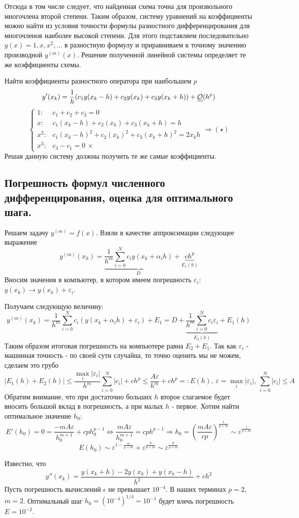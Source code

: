 Отсюда в том числе следует, что найденная схема точна для произвольного
многочлена второй степени. Таким образом, систему уравнений на
коэффициенты можно найти из условия точности формулы разностного
дифференцирования для многочленов наиболее высокой степени. Для этого
подставляем последовательно $y(x)=1,x,x^2,\ldots$ в разностную формулу
и приравниваем к точному значению производной $y^{(m)}(x)$.
Решение полученной линейной системы определяет те же коэффициенты схемы.
\begin{example}
  Найти коэффициенты разностного оператора при наибольшем $p$
  \[y'(x_k)=\frac{1}{h}(c_1y(x_k-h)+c_2y(x_k)+c_3y(x_k+h))+\underline{\underline{\mathcal{O}}}(h^p)\]
  \[\begin{cases}
      1:   & c_1+c_2+c_3=0                                \\
      x:   & c_1(x_k-h)+c_2(x_k)+c_3(x_k+h)=h             \\
      x^2: & c_1(x_k-h)^2+c_2(x_k)^2 + c_3(x_k+h)^2=2x_kh \\
      x^3: & c_3-c_1=0\ \times
    \end{cases}\Rightarrow (\star)\]
  Решая данную систему должны получить те же самые коэффициенты.
\end{example}

\subsection*{Погрешность формул
  численного дифференцирования, оценка для оптимального шага.}

Решаем задачу $y^{(m)}=f(x)$.
Взяли в качестве аппроксимации следующее выражение
\[y^{(m)}(x_k)=\underbrace{\frac{1}{h^m}\sum_{i=0}^Nc_iy(x_k+\alpha_ih)}_{D}+\underbrace{ch^p}_{E_1(h)}\]
Вносим значения в компьютер, в котором имеем погрешность $\varepsilon_i$: $y(x_k)\rightarrow y(x_k)+\varepsilon_i$.

Получаем следующую величину:
\[y^{(m)}(x_k)=\frac{1}{h^m}\sum_{i=0}^Nc_i(y(x_k+\alpha_ih)+\varepsilon_i)+E_1=D+\underbrace{\frac{1}{h^m}\sum_{i=0}^Nc_i\varepsilon_i}_{E_2(h)}+E_1(h)\]
Таким образом итоговая погрешность на компьютере равна $E_2+E_1$. Так как $\varepsilon_i$ - машинная точность - по своей сути случайна,
то точно оценить мы не можем, сделаем это грубо
\[|E_1(h)+E_2(h)|\leq\frac{\max_{i}|\varepsilon_i|}{h^m}\sum_{i=0}^{N}|c_i|+ch^p\leq\frac{A\varepsilon}{h^m}+ch^p=:E(h),\ \varepsilon=\max_{i}|\varepsilon_i|,\ \sum_{i=0}^{N}|c_i|\leq A\]
Обратим внимание, что при достаточно больших $h$ второе слагаемое будет вносить большой вклад в погрешность,
а при малых $h$ - первое. Хотим найти оптимальное значение $h_0$:
\[E'(h_0)=0=\frac{-mA\varepsilon}{h_0^{m+1}}+cph_0^{p-1}\Leftrightarrow\frac{mA\varepsilon}{h_0^{m+1}}=cph^{p-1}\Rightarrow h_0=\left(\frac{mA\varepsilon}{cp}\right)^{\frac{1}{p+m}}\sim\varepsilon^{\frac{1}{p+m}}\]
\[E(h_0)\sim \varepsilon^{1-\frac{m}{p+m}}+\varepsilon^{\frac{p}{p+m}}\sim\varepsilon^{\frac{p}{p+m}}\]
\begin{example}
  Известно, что
  \[y''(x_k)=\frac{y(x_k+h)-2y(x_k)+y(x_k-h)}{h^2}+ch^2\]
  Пусть погрешность вычислений $\epsilon$ не превышает $10^{-4}$.
  В наших терминах $p=2$, $m=2$. Оптимальный шаг $h_0=(10^{-4})^{1/4}=10^{-1}$ будет влечь погрешность $E=10^{-2}$.
\end{example}
